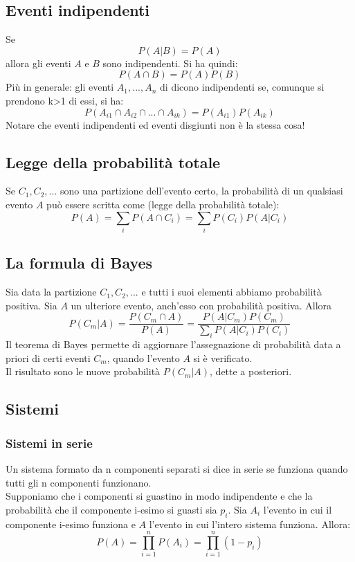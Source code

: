 \documentclass{article}
\begin{document}
\subsection{Eventi indipendenti}
Se
\begin{equation}
P(A|B) = P(A)
\end{equation}
allora gli eventi $A$ e $B$ sono indipendenti. Si ha quindi:
\begin{equation}
P({A}\cap{B}) = P(A)P(B)
\end{equation}
Più in generale: gli eventi $A_1,...,A_n$ di dicono indipendenti se, comunque si prendono k>1 di essi, si ha:
\begin{equation}
P({A_{i1}}\cap{A_{i2}}\cap{...}\cap{A_{ik}}) = P(A_{i1})P(A_{ik})
\end{equation}
Notare che eventi indipendenti ed eventi disgiunti non è la stessa cosa!
\subsection{Legge della probabilità totale}
Se $C_1,C_2,...$ sono una partizione dell'evento certo, la probabilità di un qualsiasi evento $A$ può essere scritta come (legge della probabilità totale):
\begin{equation}
P(A) = \sum\limits_{i}{ P({A}\cap{C_i})} = \sum\limits_{i}{ P({C_i})P(A|C_i)}
\end{equation}
\subsection{La formula di Bayes}
Sia data la partizione $C_1, C_2,...$ e tutti i suoi elementi abbiamo probabilità positiva. Sia $A$ un ulteriore evento, anch'esso con probabilità positiva. Allora
\begin{equation}
P(C_m|A) = \frac{P({C_m}\cap{A})}{P(A)} = \frac{P(A|C_m)P(C_m)}{\sum\limits_{i}{P(A|C_i)P(C_i)}}
\end{equation}
Il teorema di Bayes permette di aggiornare l'assegnazione di probabilità data a priori di certi eventi $C_m$, quando l'evento $A$ si è verificato.\\
Il risultato sono le nuove probabilità $P(C_m|A)$, dette a posteriori.
\subsection{Sistemi}
\subsubsection{Sistemi in serie}
Un sistema formato da n componenti separati si dice in serie se funziona quando tutti gli n componenti funzionano.\\
Supponiamo che i componenti si guastino in modo indipendente e che la probabilità che il componente i-esimo si guasti sia $p_i$. Sia  $A_i$ l'evento in cui il componente i-esimo funziona e $A$ l'evento in cui l'intero sistema funziona. Allora:\\
\begin{equation}
P(A) = \prod\limits_{i=1}^{n}P(A_i) = \prod\limits_{i=1}^{n}(1-p_i)
\end{equation}
\end{document}
